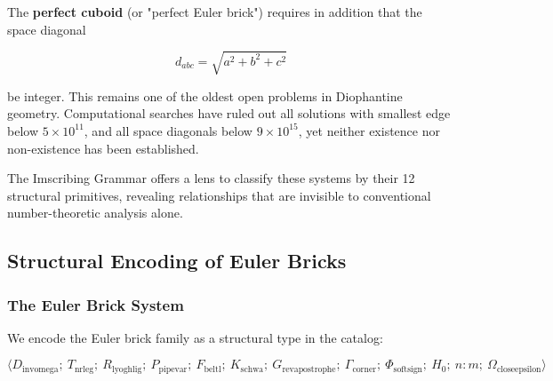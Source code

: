 \documentclass[10pt,a4paper]{article}
\begin{document}
The \textbf{perfect cuboid} (or "perfect Euler brick") requires in addition that the space diagonal

\[d_{abc} = \sqrt{a^2 + b^2 + c^2}\]

be integer. This remains one of the oldest open problems in Diophantine geometry. Computational searches have ruled out all solutions with smallest edge below $5 \times 10^{11}$, and all space diagonals below $9 \times 10^{15}$, yet neither existence nor non-existence has been established.

The Imscribing Grammar offers a lens to classify these systems by their 12 structural primitives, revealing relationships that are invisible to conventional number-theoretic analysis alone.

\subsection{Structural Encoding of Euler Bricks}

\subsubsection{The Euler Brick System}

We encode the Euler brick family as a structural type in the catalog:

\[\langle D_{\text{invomega}};\ T_{\text{nrleg}};\ R_{\text{lyoghlig}};\ P_{\text{pipevar}};\ F_{\text{beltl}};\ K_{\text{schwa}};\ G_{\text{revapostrophe}};\ \Gamma_{\text{corner}};\ \Phi_{\text{softsign}};\ H_0;\ n{:}m;\ \Omega_{\text{closeepsilon}} \rangle\]
\end{document}
